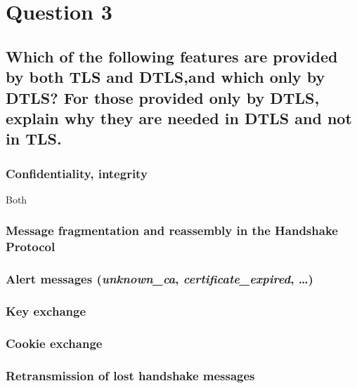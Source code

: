 \documentclass{report}
\begin{document}
	\section{Question 3}
	\startsection
		\renewcommand{\thesubsection}{\thesection.\Alph{subsection}}
		\subsection{Which of the following features are provided by both TLS and DTLS,and which only by DTLS? For those provided only by DTLS, explain why they are needed in DTLS and not in TLS.}
		\startsubsection
			\subsubsection{Confidentiality, integrity}
			\startsubsection
				Both
			\closesection
			\subsubsection{Message fragmentation and reassembly in the Handshake Protocol}
			\startsubsection
			\closesection
			\subsubsection{Alert messages (\textit{unknown\_ca}, \textit{certificate\_expired}, …)}
			\startsubsection
			\closesection
			\subsubsection{Key exchange}
			\startsubsection
			\closesection
			\subsubsection{Cookie exchange}
			\startsubsection
			\closesection
			\subsubsection{Retransmission of lost handshake messages}
			\startsubsection
			\closesection
		\closesection
	\closesection
\end{document}
